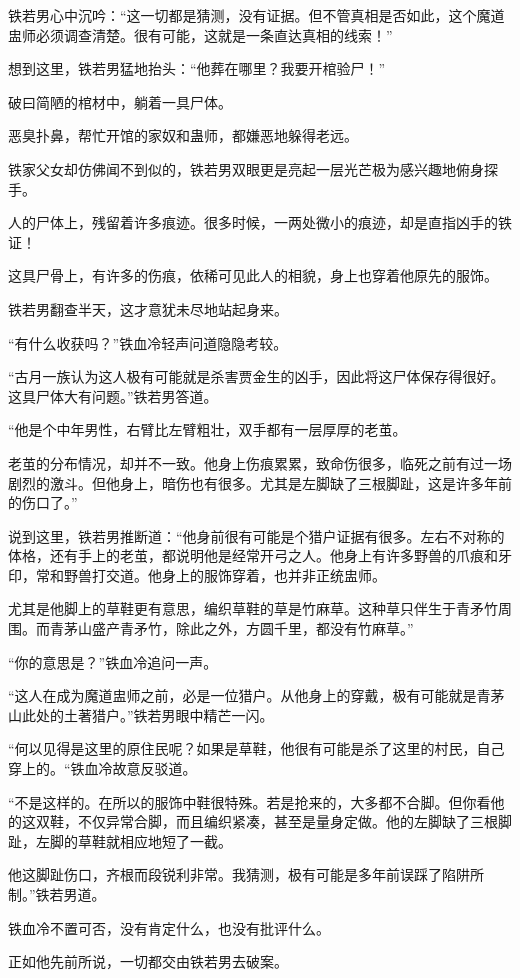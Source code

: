 \begin{this_body}
铁若男心中沉吟：“这一切都是猜测，没有证据。但不管真相是否如此，这个魔道盅师必须调查清楚。很有可能，这就是一条直达真相的线索！”

想到这里，铁若男猛地抬头：“他葬在哪里？我要开棺验尸！”

破曰简陋的棺材中，躺着一具尸体。

恶臭扑鼻，帮忙开馆的家奴和蛊师，都嫌恶地躲得老远。

铁家父女却仿佛闻不到似的，铁若男双眼更是亮起一层光芒极为感兴趣地俯身探手。

人的尸体上，残留着许多痕迹。很多时候，一两处微小的痕迹，却是直指凶手的铁证！

这具尸骨上，有许多的伤痕，依稀可见此人的相貌，身上也穿着他原先的服饰。

铁若男翻查半天，这才意犹未尽地站起身来。

“有什么收获吗？”铁血冷轻声问道隐隐考较。

“古月一族认为这人极有可能就是杀害贾金生的凶手，因此将这尸体保存得很好。这具尸体大有问题。”铁若男答道。

“他是个中年男性，右臂比左臂粗壮，双手都有一层厚厚的老茧。

老茧的分布情况，却并不一致。他身上伤痕累累，致命伤很多，临死之前有过一场剧烈的激斗。但他身上，暗伤也有很多。尤其是左脚缺了三根脚趾，这是许多年前的伤口了。”

说到这里，铁若男推断道：“他身前很有可能是个猎户证据有很多。左右不对称的体格，还有手上的老茧，都说明他是经常开弓之人。他身上有许多野兽的爪痕和牙印，常和野兽打交道。他身上的服饰穿着，也并非正统盅师。

尤其是他脚上的草鞋更有意思，编织草鞋的草是竹麻草。这种草只伴生于青矛竹周围。而青茅山盛产青矛竹，除此之外，方圆千里，都没有竹麻草。”

“你的意思是？”铁血冷追问一声。

“这人在成为魔道盅师之前，必是一位猎户。从他身上的穿戴，极有可能就是青茅山此处的土著猎户。”铁若男眼中精芒一闪。

“何以见得是这里的原住民呢？如果是草鞋，他很有可能是杀了这里的村民，自己穿上的。“铁血冷故意反驳道。

“不是这样的。在所以的服饰中鞋很特殊。若是抢来的，大多都不合脚。但你看他的这双鞋，不仅异常合脚，而且编织紧凑，甚至是量身定做。他的左脚缺了三根脚趾，左脚的草鞋就相应地短了一截。

他这脚趾伤口，齐根而段锐利非常。我猜测，极有可能是多年前误踩了陷阱所制。”铁若男道。

铁血冷不置可否，没有肯定什么，也没有批评什么。

正如他先前所说，一切都交由铁若男去破案。


\end{this_body}
